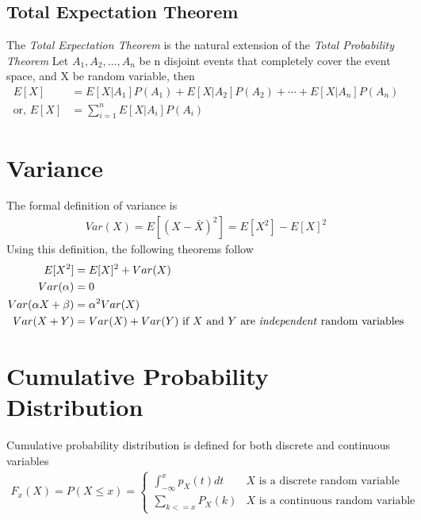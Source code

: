 \documentclass[../probability-notes.tex]{subfiles}
\begin{document}
    \subsection{Total Expectation Theorem}
    The \emph{Total Expectation Theorem} is the natural extension of the \emph{Total Probability Theorem}
    Let $A_{1}, A_{2}, \ldots, A_{n}$ be n disjoint events that completely cover the event space, and X be random variable, then
    \begin{align*}
        E[X] &= E[X|A_{1}]P(A_{1}) + E[X|A_{2}]P(A_{2}) + \cdots + E[X|A_{n}]P(A_{n})\\
        \text{or, } E[X] &= \sum_{i=1}^{n} E[X|A_{i}]P(A_{i})
    \end{align*}

    \section{Variance}
    The formal definition of variance is
    \begin{align*}
        Var(X) = E[(X - \bar{X})^{2}] = E[X^{2}] - E[X]^{2}
    \end{align*}
    Using this definition, the following theorems follow
    \begin{align*}
        E[X^{2}] &= E[X]^{2} + Var(X) \\
        Var(\alpha) &= 0 \\
        Var(\alpha X + \beta) &= \alpha^{2} Var(X) \\
        Var(X + Y) &= Var(X) + Var(Y) \text{  if $X$ and $Y$ are \emph{independent} random variables}
    \end{align*}

    \section{Cumulative Probability Distribution}
    Cumulative probability distribution is defined for both discrete and continuous variables
    \begin{align*}
        F_{x}(X) = P(X \leq x) = \begin{cases} \int_{-\infty}^{x} p_{X}(t) dt &\mbox{$X$ is a discrete random variable}\\
        \sum_{k <= x} P_{X}(k) &\mbox{$X$ is a continuous random variable} \end{cases}
    \end{align*}


\end{document}
